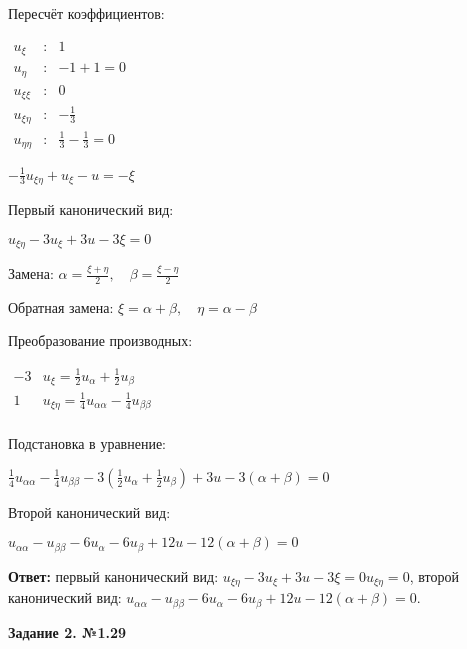 \documentclass[a4paper,12pt]{article}
\begin{document}
Пересчёт коэффициентов:
\begin{flushleft}
\(
\begin{array}{rcl}
u_{\xi} & : & 1 \\
u_{\eta} & : & -1+1=0 \\
u_{\xi\xi} & : & 0\\
u_{\xi\eta} & : & -\frac{1}{3}\\
u_{\eta\eta} & : &  \frac{1}{3} -  \frac{1}{3} = 0
\end{array}
\)
\end{flushleft}
\begin{flushleft}
$-\frac{1}{3} u_{\xi\eta} + u_{\xi} - u = -\xi$
\end{flushleft}
Первый канонический вид:
\begin{flushleft}
$u_{\xi\eta} - 3 u_{\xi} + 3 u - 3 \xi = 0$
\end{flushleft}
\begin{flushleft}
Замена:
$\alpha = \frac{\xi + \eta}{2}, \quad \beta = \frac{\xi - \eta}{2}$
\end{flushleft}
\begin{flushleft}
Обратная замена:
$\xi = \alpha + \beta, \quad \eta = \alpha - \beta$
\end{flushleft}
Преобразование производных:
\begin{flushleft}
\(
\begin{array}{r|l}
-3 & u_{\xi} = \frac{1}{2} u_{\alpha} + \frac{1}{2} u_{\beta}\\
1 & u_{\xi\eta} = \frac{1}{4} u_{\alpha\alpha} - \frac{1}{4} u_{\beta\beta} \\
\end{array}
\)
\end{flushleft}
Подстановка в уравнение:
\begin{flushleft}
$\frac{1}{4} u_{\alpha\alpha} - \frac{1}{4} u_{\beta\beta} - 3(\frac{1}{2} u_{\alpha} + \frac{1}{2} u_{\beta}) + 3u - 3(\alpha + \beta)=0$
\end{flushleft}
Второй канонический вид:
\begin{flushleft}
$u_{\alpha\alpha} - u_{\beta\beta} - 6u_{\alpha} -6u_{\beta}+ 12u - 12(\alpha + \beta)=0$
\end{flushleft}
\textbf{Ответ:} первый канонический вид: $u_{\xi\eta} - 3 u_{\xi} + 3 u - 3 \xi = 0$$ u_{\xi\eta} = 0$, второй канонический вид: $u_{\alpha\alpha} - u_{\beta\beta} - 6u_{\alpha} -6u_{\beta}+ 12u - 12(\alpha + \beta)=0$.



\begin{center}    
\noindent \textbf{Задание 2. №1.29}
\end{center}
\end{document}
